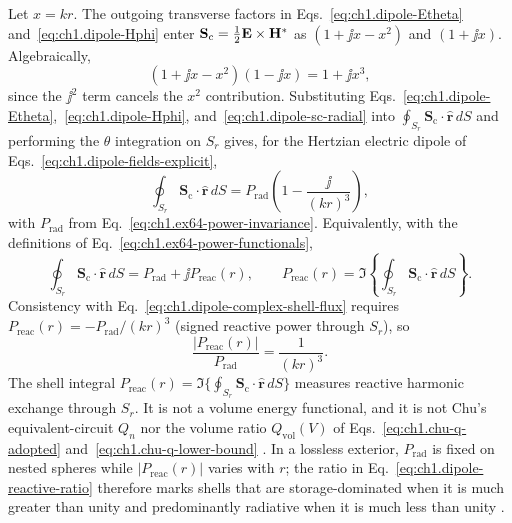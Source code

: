 Let $x=kr$. The outgoing transverse factors in Eqs.~\eqref{eq:ch1.dipole-Etheta} and~\eqref{eq:ch1.dipole-Hphi} enter $\mathbf{S}_\mathrm{c}=\tfrac12\mathbf{E}\times\mathbf{H}^*$ as $(1+\jj x-x^2)$ and $(1+\jj x)$. Algebraically,
\begin{equation}
\label{eq:ch1.dipole-shell-algebra}
(1+\jj x-x^2)(1-\jj x)=1+\jj x^3,
\end{equation}
since the $\jj^2$ term cancels the $x^2$ contribution. Substituting Eqs.~\eqref{eq:ch1.dipole-Etheta},~\eqref{eq:ch1.dipole-Hphi}, and~\eqref{eq:ch1.dipole-sc-radial} into $\oint_{S_r}\mathbf{S}_\mathrm{c}\cdot\hat{\mathbf{r}}\,dS$ and performing the $\theta$ integration on $S_r$ gives, for the Hertzian electric dipole of Eqs.~\eqref{eq:ch1.dipole-fields-explicit},
\begin{equation}
\label{eq:ch1.dipole-complex-shell-flux}
\oint_{S_r}\mathbf{S}_\mathrm{c}\cdot\hat{\mathbf{r}}\,dS
=P_{\mathrm{rad}}\left(1-\frac{\jj}{(kr)^3}\right),
\end{equation}
with $P_{\mathrm{rad}}$ from Eq.~\eqref{eq:ch1.ex64-power-invariance}. Equivalently, with the definitions of Eq.~\eqref{eq:ch1.ex64-power-functionals},
\begin{equation}
\label{eq:ch1.ex64-complex-power}
\oint_{S_r}\mathbf{S}_\mathrm{c}\cdot\hat{\mathbf{r}}\,dS
=P_{\mathrm{rad}}+\jj P_{\mathrm{reac}}(r),
\qquad
P_{\mathrm{reac}}(r)=\Im\!\left\{\oint_{S_r}\mathbf{S}_\mathrm{c}\cdot\hat{\mathbf{r}}\,dS\right\}.
\end{equation}
Consistency with Eq.~\eqref{eq:ch1.dipole-complex-shell-flux} requires $P_{\mathrm{reac}}(r)=-P_{\mathrm{rad}}/(kr)^3$ (signed reactive power through $S_r$), so
\begin{equation}
\label{eq:ch1.dipole-reactive-ratio}
\frac{\bigl|P_{\mathrm{reac}}(r)\bigr|}{P_{\mathrm{rad}}}=\frac{1}{(kr)^3}.
\end{equation}
The shell integral $P_{\mathrm{reac}}(r)=\Im\{\oint_{S_r}\mathbf{S}_\mathrm{c}\cdot\hat{\mathbf{r}}\,dS\}$ measures reactive harmonic exchange through $S_r$. It is not a volume energy functional, and it is not Chu's equivalent-circuit $Q_n$ nor the volume ratio $Q_{\mathrm{vol}}(V)$ of Eqs.~\eqref{eq:ch1.chu-q-adopted} and~\eqref{eq:ch1.chu-q-lower-bound} \cite{poynting1884,stratton1941,chu1948,mcclean1996}. In a lossless exterior, $P_{\mathrm{rad}}$ is fixed on nested spheres while $\bigl|P_{\mathrm{reac}}(r)\bigr|$ varies with $r$; the ratio in Eq.~\eqref{eq:ch1.dipole-reactive-ratio} therefore marks shells that are storage-dominated when it is much greater than unity and predominantly radiative when it is much less than unity \cite{stratton1941}.

